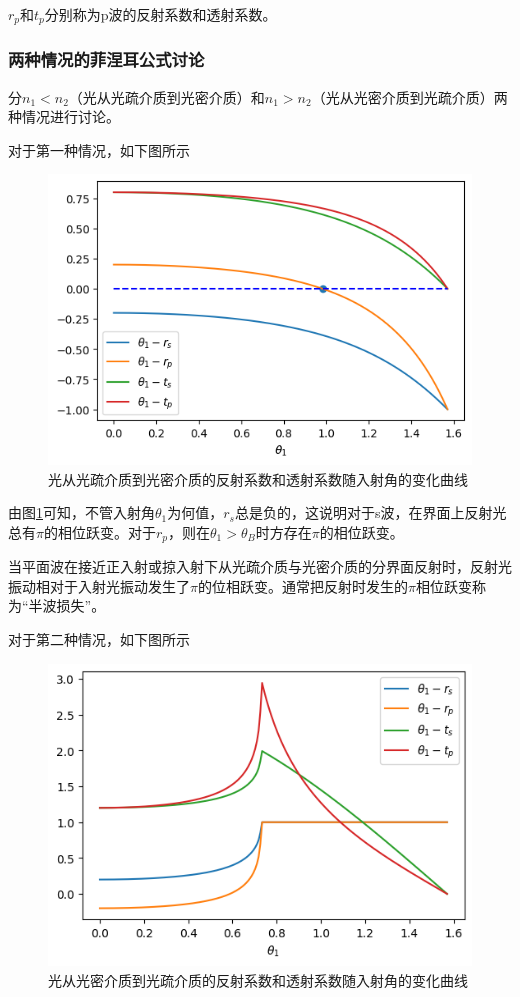\documentclass[UTF8]{ctexart}
\begin{document}
\noindent $ r_{p} $和$ t_{p} $分别称为p波的反射系数和透射系数。

	\subsubsection{两种情况的菲涅耳公式讨论}
	分$ n_{1}<n_{2} $（光从光疏介质到光密介质）和$ n_{1}>n_{2} $（光从光密介质到光疏介质）两种情况进行讨论。
	
	\newpage
	对于第一种情况，如下图所示
	\begin{figure}[ht]
		\centering
		\includegraphics[width=12cm]{Fenier_equ1.png}
		\caption{光从光疏介质到光密介质的反射系数和透射系数随入射角的变化曲线}
		\label{figure_Fenier_equ1}
	\end{figure}

	由图\ref{figure_Fenier_equ1}可知，不管入射角$ \theta_{1} $为何值，$ r_{s} $总是负的，这说明对于s波，在界面上反射光总有$ \pi $的相位跃变。对于$ r_{p} $，则在$ \theta_{1}>\theta_{B} $时方存在$ \pi $的相位跃变。
	
	当平面波在接近正入射或掠入射下从光疏介质与光密介质的分界面反射时，反射光振动相对于入射光振动发生了$ \pi $的位相跃变。通常把反射时发生的$ \pi $相位跃变称为“半波损失”。
	
	对于第二种情况，如下图所示
		\begin{figure}[ht]
		\centering
		\includegraphics[width=12cm]{Fenier_equ2.png}
		\caption{光从光密介质到光疏介质的反射系数和透射系数随入射角的变化曲线}
		\label{figure_Fenier_equ2}
	\end{figure}
\end{document}
